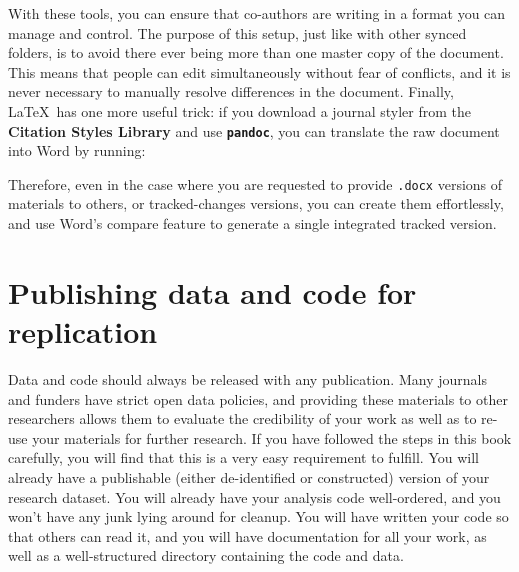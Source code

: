With these tools, you can ensure that co-authors are writing
in a format you can manage and control.\cite{flom2005latex}
The purpose of this setup, just like with other synced folders,
is to avoid there ever being more than one master copy of the document.
This means that people can edit simultaneously without fear of conflicts,
and it is never necessary to manually resolve differences in the document.
Finally, \LaTeX\ has one more useful trick:
if you download a journal styler from the \textbf{Citation Styles Library}
and use \textbf{\texttt{pandoc}},
you can translate the raw document into Word by running:

{
}

Therefore, even in the case where you are requested to provide
\texttt{.docx} versions of materials to others, or tracked-changes versions,
you can create them effortlessly,
and use Word's compare feature to generate a single integrated tracked version.


\section{Publishing data and code for replication}

Data and code should always be released with any publication.
Many journals and funders have strict open data policies,
and providing these materials to other researchers
allows them to evaluate the credibility of your work
as well as to re-use your materials for further research.
If you have followed the steps in this book carefully,
you will find that this is a very easy requirement to fulfill.
You will already have a publishable (either de-identified or constructed)
version of your research dataset.
You will already have your analysis code well-ordered,
and you won't have any junk lying around for cleanup.
You will have written your code so that others can read it,
and you will have documentation for all your work,
as well as a well-structured directory containing the code and data.

